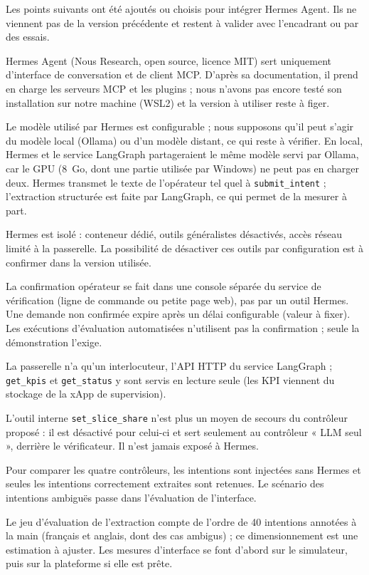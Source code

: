 \documentclass[11pt,a4paper]{article}
\newcommand{\tool}[1]{\texttt{#1}}
\begin{document}
Les points suivants ont été ajoutés ou choisis pour intégrer Hermes Agent. Ils ne viennent
pas de la version précédente et restent à valider avec l'encadrant ou par des essais.

\begin{description}[leftmargin=2.6em,labelwidth=2.2em,labelsep=0.4em,font=\bfseries]
  \item[H1] Hermes Agent (Nous Research, open source, licence MIT) sert uniquement
        d'interface de conversation et de client MCP. D'après sa documentation, il prend en
        charge les serveurs MCP et les plugins ; nous n'avons pas encore testé son
        installation sur notre machine (WSL2) et la version à utiliser reste à figer.
  \item[H2] Le modèle utilisé par Hermes est configurable ; nous supposons qu'il peut s'agir
        du modèle local (Ollama) ou d'un modèle distant, ce qui reste à vérifier. En local, Hermes
        et le service LangGraph partageraient le même modèle servi par Ollama, car le GPU
        (8~Go, dont une partie utilisée par Windows) ne peut pas en charger deux. Hermes
        transmet le texte de l'opérateur tel quel à \tool{submit\_intent} ; l'extraction
        structurée est faite par LangGraph, ce qui permet de la mesurer à part.
  \item[H3] Hermes est isolé : conteneur dédié, outils généralistes désactivés, accès réseau
        limité à la passerelle. La possibilité de désactiver ces outils par configuration
        est à confirmer dans la version utilisée.
  \item[H4] La confirmation opérateur se fait dans une console séparée du service de
        vérification (ligne de commande ou petite page web), pas par un outil Hermes. Une
        demande non confirmée expire après un délai configurable (valeur à fixer). Les
        exécutions d'évaluation automatisées n'utilisent pas la confirmation ; seule la
        démonstration l'exige.
  \item[H5] La passerelle n'a qu'un interlocuteur, l'API HTTP du service LangGraph ;
        \tool{get\_kpis} et \tool{get\_status} y sont servis en lecture seule (les KPI viennent
        du stockage de la xApp de supervision).
  \item[H6] L'outil interne \tool{set\_slice\_share} n'est plus un moyen de secours du
        contrôleur proposé : il est désactivé pour celui-ci et sert seulement au contrôleur
        « LLM seul », derrière le vérificateur. Il n'est jamais exposé à Hermes.
  \item[H7] Pour comparer les quatre contrôleurs, les intentions sont injectées sans Hermes et
        seules les intentions correctement extraites sont retenues. Le scénario des intentions
        ambiguës passe dans l'évaluation de l'interface.
  \item[H8] Le jeu d'évaluation de l'extraction compte de l'ordre de 40 intentions annotées à
        la main (français et anglais, dont des cas ambigus) ; ce dimensionnement est une
        estimation à ajuster. Les mesures d'interface se font d'abord sur le simulateur, puis
        sur la plateforme si elle est prête.
\end{description}
\end{document}
